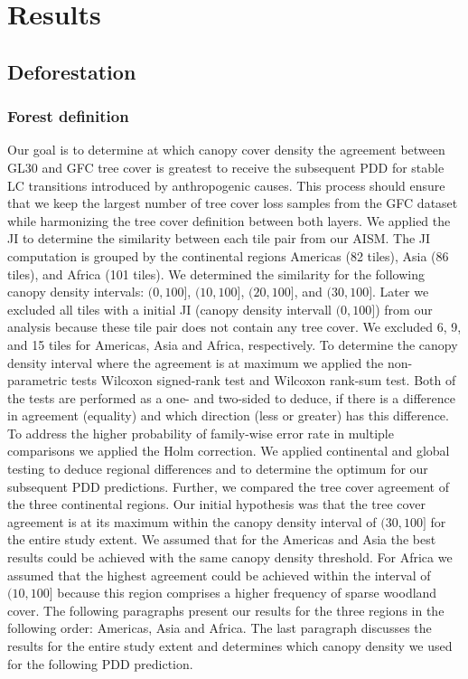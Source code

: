 \chapter{Results}
\label{ch:results}

	\section{Deforestation}
	\label{sec:results_deforestation}

		\subsection{Forest definition}
		\label{subsec:results_forest_definition}
			Our goal is to determine at which canopy cover density the agreement between \ac{GL30} and \ac{GFC} tree cover is greatest to receive the subsequent \ac{PDD} for stable \ac{LC} transitions introduced by anthropogenic causes. This process should ensure that we keep the largest number of tree cover loss samples from the \ac{GFC} dataset while harmonizing the tree cover definition between both layers. We applied the \ac{JI} to determine the similarity between each tile pair from our \ac{AISM}. The \ac{JI} computation is grouped by the continental regions Americas (82 tiles), Asia (86 tiles), and Africa (101 tiles). We determined the similarity for the following canopy density intervals: $(0, 100]$, $(10, 100]$, $(20, 100]$, and $(30, 100]$. Later we excluded all tiles with a initial \ac{JI} (canopy density intervall $(0,100]$) from our analysis because these tile pair does not contain any tree cover. We excluded 6, 9, and 15 tiles for Americas, Asia and Africa, respectively. To determine the canopy density interval where the agreement is at maximum we applied the non-parametric tests Wilcoxon signed-rank test and Wilcoxon rank-sum test. Both of the tests are performed as a one- and two-sided to deduce, if there is a difference in agreement (equality) and which direction (less or greater) has this difference. To address the higher probability of family-wise error rate in multiple comparisons we applied the Holm correction. We applied continental and global testing to deduce regional differences and to determine the optimum for our subsequent \ac{PDD} predictions. Further, we compared the tree cover agreement of the three continental regions. Our initial hypothesis was that the tree cover agreement is at its maximum within the canopy density interval of $(30,100]$ for the entire study extent. We assumed that for the Americas and Asia the best results could be achieved with the same canopy density threshold. For Africa we assumed that the highest agreement could be achieved within the interval of $(10,100]$ because this region comprises a higher frequency of sparse woodland cover. The following paragraphs present our results for the three regions in the following order: Americas, Asia and Africa. The last paragraph discusses the results for the entire study extent and determines which canopy density we used for the following \ac{PDD} prediction.

